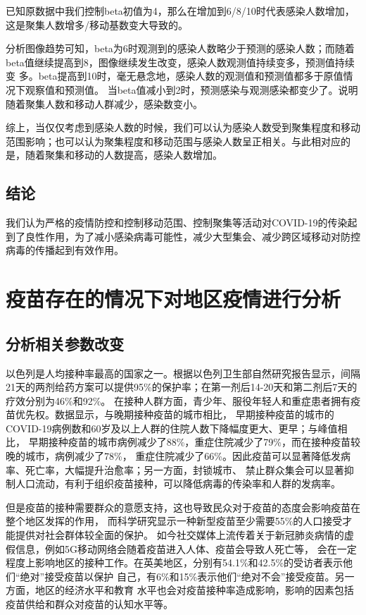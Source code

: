 \documentclass[withoutpreface,bwprint]{cumcmthesis} %
\begin{document}
已知原数据中我们控制beta初值为4，那么在增加到6/8/10时代表感染人数增加，这是聚集人数增多/移动基数变大导致的。

分析图像趋势可知，beta为6时观测到的感染人数略少于预测的感染人数；而随着beta值继续提高到8，图像继续发生改变，感染人数观测值持续变多，预测值持续变
多。beta提高到10时，毫无悬念地，感染人数的观测值和预测值都多于原值情况下观察值和预测值。
当beta值减小到2时，预测感染与观测感染都变少了。说明随着聚集人数和移动人群减少，感染数变小。

综上，当仅仅考虑到感染人数的时候，我们可以认为感染人数受到聚集程度和移动范围影响；也可以认为聚集程度和移动范围与感染人数呈正相关。与此相对应的是，随着聚集和移动的人数提⾼，感染人数增加。


\subsection{结论}
我们认为严格的疫情防控和控制移动范围、控制聚集等活动对COVID-19的传染起到了良性作用，为了减小感染病毒可能性，减少大型集会、减少跨区域移动对防控病毒的传播起到有效作用。

\clearpage
\section{疫苗存在的情况下对地区疫情进行分析}
\subsection{分析相关参数改变}
以色列是人均接种率最高的国家之一。根据以色列卫生部自然研究报告显示，间隔
21天的两剂给药方案可以提供95\%的保护率；在第一剂后14-20天和第二剂后7天的疗效分别为46\%和92\%。
在接种人群方面，青少年、服役年轻人和重症患者拥有疫苗优先权。数据显示，与晚期接种疫苗的城市相比，
早期接种疫苗的城市的COVID-19病例数和60岁及以上人群的住院人数下降幅度更大、更早；与峰值相比，
早期接种疫苗的城市病例减少了88\%，重症住院减少了79\%，而在接种疫苗较晚的城市，病例减少了78\%，
重症住院减少了66\%。因此疫苗可以显著降低发病率、死亡率，大幅提升治愈率；另一方面，封锁城市、
禁止群众集会可以显著抑制人口流动，有利于组织疫苗接种，可以降低病毒的传染率和人群的发病率。

但是疫苗的接种需要群众的意愿支持，这也导致民众对于疫苗的态度会影响疫苗在整个地区发挥的作用，
而科学研究显示一种新型疫苗至少需要55\%的人口接受才能提供对社会群体较全面的保护。
如今社交媒体上流传着关于新冠肺炎病情的虚假信息，例如5G移动网络会随着疫苗进入人体、疫苗会导致人死亡等，
会在一定程度上影响地区的接种⼯作。在英美地区，分别有54.1\%和42.5\%的受访者表示他们“绝对”接受疫苗以保护
自己，有6\%和15\%表示他们“绝对不会”接受疫苗。另一方面，地区的经济水平和教育
水平也会对疫苗接种率造成影响，影响的因素包括疫苗供给和群众对疫苗的认知水平等。
\end{document}

